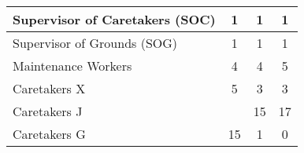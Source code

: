 \begin{tabular}{l|c|c|c|}
        \multicolumn{1}{|l|}{\cellcolor{ccfuschialight}Supervisor of Caretakers (SOC)} & 1                                                      & 1                                                                & 1                                                      \\ \hline
        \multicolumn{1}{|l|}{\cellcolor{ccfuschialight}Supervisor of Grounds (SOG)}    & 1                                                      & 1                                                                & 1                                                      \\ \hline
        \multicolumn{1}{|l|}{\cellcolor{ccfuschialight}Maintenance Workers}            & 4                                                      & 4                                                                & 5                                                       \\ \hline
        \multicolumn{1}{|l|}{\cellcolor{ccfuschialight}Caretakers X}                   & 5                                                      & 3                                                                & 3                                                      \\ \hline
        \multicolumn{1}{|l|}{\cellcolor{ccfuschialight}Caretakers J\tnote{2}}                   &                                                       & 15                                                                & 17                                                        \\ \cline{1-1} \cline{3-4}
        \multicolumn{1}{|l|}{\cellcolor{ccfuschialight}Caretakers G}                   & \multirow{-2}{*}{15}                                                      & 1                                     & 0                            \\ \hline
        \end{tabular}
        
        